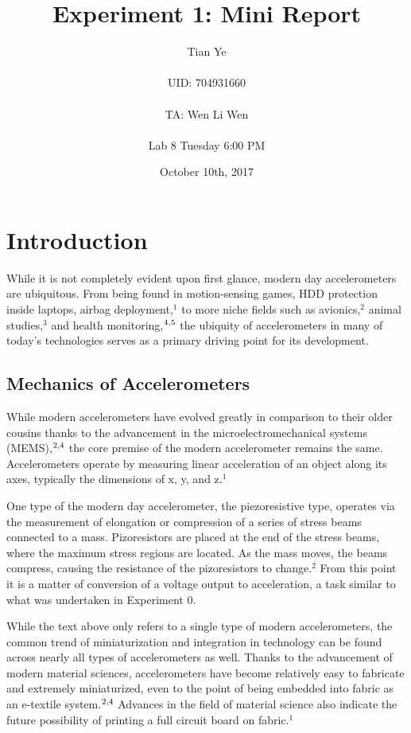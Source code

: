 \documentclass[titlepage]{article}
\begin{document}
\title{Experiment 1: Mini Report}
\author{Tian Ye \\ \\ UID: 704931660 \\ \\ TA: Wen Li Wen \\ \\ Lab 8 Tuesday 6:00 PM}
\date{October 10th, 2017}

\maketitle

\section*{Introduction}

While it is not completely evident upon first glance, modern day accelerometers are ubiquitous. From being found in motion-sensing games, HDD protection inside laptops, airbag deployment,$^1$ to more niche fields such as avionics,$^2$ animal studies,$^3$ and health monitoring,$\textsuperscript{4,5}$ the ubiquity of accelerometers in many of today's technologies serves as a primary driving point for its development. 

\subsection*{Mechanics of Accelerometers}

While modern accelerometers have evolved greatly in comparison to their older cousins thanks to the advancement in the microelectromechanical systems (MEMS),$\textsuperscript{2,4}$ the core premise of the modern accelerometer remains the same. 
Accelerometers operate by measuring linear acceleration of an object along its axes, typically the dimensions of x, y, and z.$^1$ 

One type of the modern day accelerometer, the piezoresistive type, operates via the measurement of elongation or compression of a series of stress beams connected to a mass. Pizoresistors are placed at the end of the stress beams, where the maximum stress regions are located. As the mass moves, the beams compress, causing the resistance of the pizoresistors to change.$^2$
From this point it is a matter of conversion of a voltage output to acceleration, a task similar to what was undertaken in Experiment 0.

While the text above only refers to a single type of modern accelerometers, the common trend of miniaturization and integration in technology can be found across nearly all types of accelerometers as well.
Thanks to the advancement of modern material sciences, accelerometers have become relatively easy to fabricate and extremely miniaturized, even to the point of being embedded into fabric as an e-textile system.$\textsuperscript{2,4}$ Advances in the field of material science also indicate the future possibility of printing a full circuit board on fabric.$^1$
\end{document}
